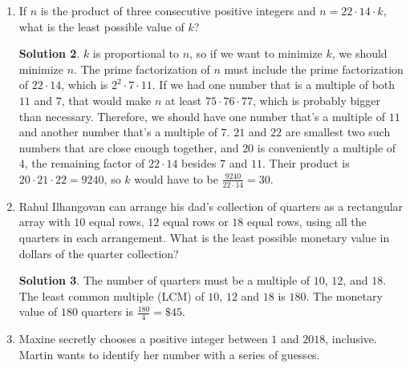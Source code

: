 \documentclass{article}
\theoremstyle{definition}
\newtheorem*{solution}{Solution}
\begin{document}
\begin{multicols}{2}
\begin{enumerate}
\begin{solution}
            The multiples of $30$ from $1$ to $1000$ are $1 \cdot 30 = 30$, $2 \cdot 30 = 60$, all the way to $33 \cdot 30 = 990$, so there are $33$ of them.
            We need to subtract out the numbers included here which are multiples of $8$.
            The numbers which are multiples of both $30$ and $8$ are the multiples of the LCM of $30$ and $8$, which is $120$.
            The largest multiple of $120$ less than $1000$ is $120 \cdot 8 = 960$, so we need to subtract $8$ from $33$ to get $\boxed{25}$.
        \end{solution}
        \item If $n$ is the product of three consecutive positive integers and $n = 22 \cdot 14 \cdot k$,
        what is the least possible value of $k$?
        \begin{solution}
            $k$ is proportional to $n$, so if we want to minimize $k$, we should minimize $n$.
            The prime factorization of $n$ must include the prime factorization of $22 \cdot 14$, which is $2^2 \cdot 7 \cdot 11$.
            If we had one number that is a multiple of both $11$ and $7$, that would make $n$ at least $75 \cdot 76 \cdot 77$, which is probably bigger than necessary.
            Therefore, we should have one number that's a multiple of $11$ and another number that's a multiple of $7$.
            $21$ and $22$ are smallest two such numbers that are close enough together, and $20$ is conveniently a multiple of $4$, the remaining factor of $22 \cdot 14$ besides $7$ and $11$.
            Their product is $20 \cdot 21 \cdot 22 = 9240$, so $k$ would have to be $\frac{9240}{22 \cdot 14} = \boxed{30}$.
        \end{solution}
        \item Rahul Ilhangovan can arrange his dad's collection of quarters as a rectangular array with $10$ equal rows,
        $12$ equal rows or $18$ equal rows, using all the quarters in each arrangement.
        What is the least possible monetary value in dollars of the quarter collection?
        \begin{solution}
            The number of quarters must be a multiple of $10$, $12$, and $18$.
            The least common multiple (LCM) of $10$, $12$ and $18$ is $180$.
            The monetary value of $180$ quarters is $\frac{180}{4} = \boxed{\$45}$.
        \end{solution}
        \item Maxine secretly chooses a positive integer between $1$ and $2018$, inclusive.
        Martin wants to identify her number with a series of guesses.

\end{enumerate}
\end{multicols}
\end{document}
